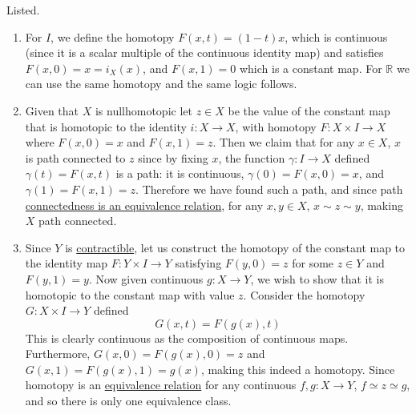   \begin{solution}
    Listed. 
    \begin{enumerate}
      \item For $I$, we define the homotopy $F(x, t) = (1 - t)x$, which is continuous (since it is a scalar multiple of the continuous identity map) and satisfies $F(x, 0) = x = i_X(x)$, and $F(x, 1) = 0$ which is a constant map. For $\mathbb{R}$ we can use the same homotopy and the same logic follows. 

      \item Given that $X$ is nullhomotopic let $z \in X$ be the value of the constant map that is homotopic to the identity $i: X \rightarrow X$, with homotopy $F: X \times I \rightarrow X$ where $F(x, 0) = x$ and $F(x, 1) = z$. Then we claim that for any $x \in X$, $x$ is path connected to $z$ since by fixing $x$, the function $\gamma: I \rightarrow X$ defined $\gamma(t) = F(x, t)$ is a path: it is continuous, $\gamma(0) = F(x, 0) = x$, and $\gamma(1) = F(x, 1) = z$. Therefore we have found such a path, and since path \hyperref[pst-thm:connectedness-is-an-equivalence-relation]{connectedness is an equivalence relation}, for any $x, y \in X$, $x \sim z \sim y$, making $X$ path connected. 

      \item Since $Y$ is \hyperref[def:contractible]{contractible}, let us construct the homotopy of the constant map to the identity map $F: Y \times I \rightarrow Y$ satisfying $F(y, 0) = z$ for some $z \in Y$ and $F(y, 1) = y$. Now given continuous $g: X \rightarrow Y$, we wish to show that it is homotopic to the constant map with value $z$. Consider the homotopy $G: X \times I \rightarrow Y$ defined 
      \begin{equation}
        G(x, t) = F(g(x), t)
      \end{equation}
      This is clearly continuous as the composition of continuous maps. Furthermore, $G(x, 0) = F(g(x), 0) = z$ and $G(x, 1) = F(g(x), 1) = g(x)$, making this indeed a homotopy. Since homotopy is an \hyperref[st-def:equivalence_relation]{equivalence relation} for any continuous $f, g: X \rightarrow Y$, $f \simeq z \simeq g$, and so there is only one equivalence class. 


\end{enumerate}
\end{solution}
